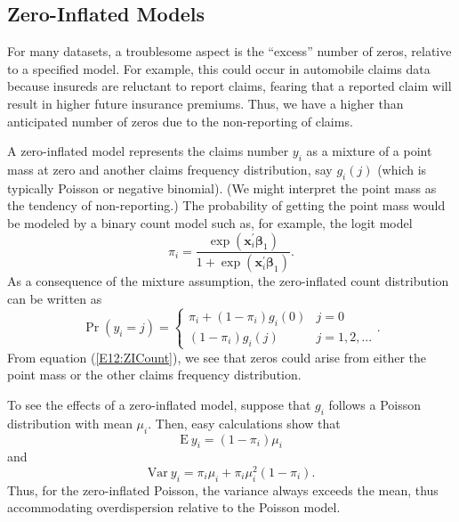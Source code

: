 {\subsection{Zero-Inflated Models}

For many datasets, a troublesome aspect is the ``excess'' number of
zeros, relative to a specified model. For example, this could occur
in automobile claims data because insureds are reluctant to report
claims, fearing that a reported claim will result in higher future
insurance premiums. Thus, we have a higher than anticipated number
of zeros due to the non-reporting of claims.

A zero-inflated model represents the claims number $y_i$ as a
mixture of a point mass at zero and another claims frequency
distribution, say $g_i(j)$ (which is typically Poisson or negative
binomial). (We might interpret the point mass as the tendency of
non-reporting.) The probability of getting the point mass would be
modeled by a binary count model such as, for example, the logit
model
\begin{equation*}
\pi_i=\frac{\exp \left( \mathbf{x}_i^{\prime}\boldsymbol \beta%
_{1}\right) }{1+\exp \left( \mathbf{x}_i^{\prime}\boldsymbol \beta%
_{1}\right) }.
\end{equation*}
As a consequence of the mixture assumption, the zero-inflated count
distribution can be written as
\begin{equation}\label{E12:ZICount}
\Pr \left( y_i=j\right) =\left\{
\begin{array}{ll}
\pi_i+(1-\pi_i)g_i(0) & j=0 \\
(1-\pi_i)g_i(j) & j=1,2,...
\end{array}
\right. .
\end{equation}
From equation (\ref{E12:ZICount}), we see that zeros could arise
from either the point mass or the other claims frequency
distribution.

To see the effects of a zero-inflated model, suppose that $g_i$
follows a Poisson distribution with mean $\mu_i$. Then, easy
calculations show that
\begin{equation*}
\mathrm{E~} y_i = (1 - \pi_i) \mu_i
\end{equation*}
and%
\begin{equation*}
\mathrm{Var~} y_i = \pi_i \mu_i+\pi_i\mu_i^2(1-\pi_i).
\end{equation*}%
Thus, for the zero-inflated Poisson, the variance always exceeds the
mean, thus accommodating overdispersion relative to the Poisson
model.

}
